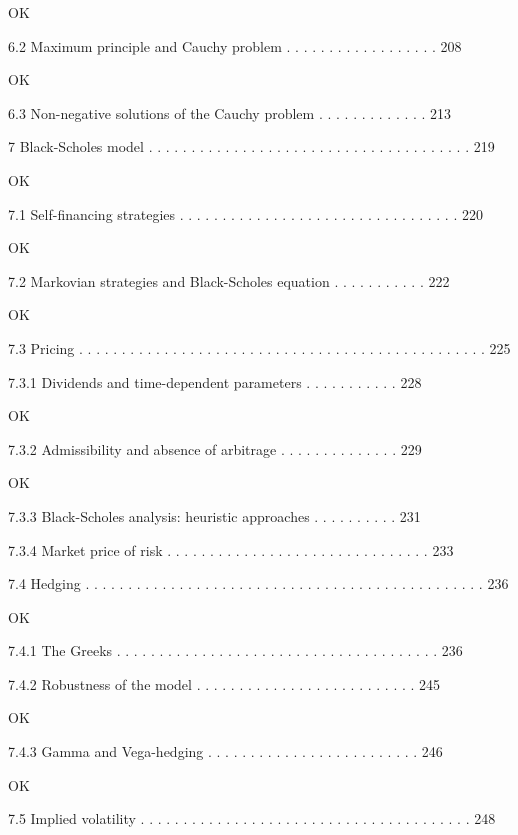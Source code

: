 OK

6.2 Maximum principle and Cauchy problem . . . . . . . . . . . . . . . . . . 208

OK

6.3 Non-negative solutions of the Cauchy problem . . . . . . . . . . . . . 213



7 Black-Scholes model . . . . . . . . . . . . . . . . . . . . . . . . . . . . . . . . . . . . . . 219

OK

7.1 Self-financing strategies . . . . . . . . . . . . . . . . . . . . . . . . . . . . . . . . . 220

OK

7.2 Markovian strategies and Black-Scholes equation . . . . . . . . . . . 222

OK

7.3 Pricing . . . . . . . . . . . . . . . . . . . . . . . . . . . . . . . . . . . . . . . . . . . . . . . . 225



7.3.1 Dividends and time-dependent parameters . . . . . . . . . . . 228

OK

7.3.2 Admissibility and absence of arbitrage . . . . . . . . . . . . . . 229

OK

7.3.3 Black-Scholes analysis: heuristic approaches . . . . . . . . . . 231



7.3.4 Market price of risk . . . . . . . . . . . . . . . . . . . . . . . . . . . . . . . 233



7.4 Hedging . . . . . . . . . . . . . . . . . . . . . . . . . . . . . . . . . . . . . . . . . . . . . . . 236

OK

7.4.1 The Greeks . . . . . . . . . . . . . . . . . . . . . . . . . . . . . . . . . . . . . . 236



7.4.2 Robustness of the model . . . . . . . . . . . . . . . . . . . . . . . . . . 245

OK

7.4.3 Gamma and Vega-hedging . . . . . . . . . . . . . . . . . . . . . . . . . 246

OK

7.5 Implied volatility . . . . . . . . . . . . . . . . . . . . . . . . . . . . . . . . . . . . . . . 248




